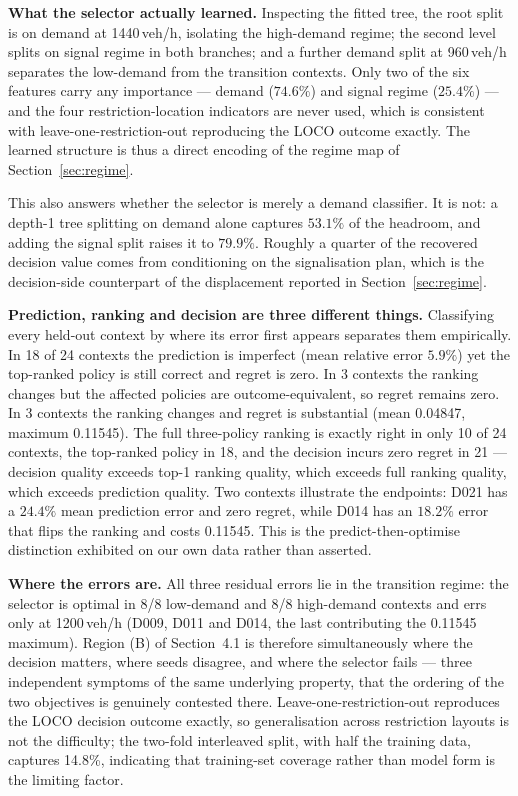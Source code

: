 \documentclass[10pt,a4paper]{article}
\begin{document}
\textbf{What the selector actually learned.} Inspecting the fitted tree, the root split is on demand at 1440\,veh/h, isolating the high-demand regime; the second level splits on signal regime in both branches; and a further demand split at 960\,veh/h separates the low-demand from the transition contexts. Only two of the six features carry any importance --- demand ($74.6\%$) and signal regime ($25.4\%$) --- and the four restriction-location indicators are never used, which is consistent with leave-one-restriction-out reproducing the LOCO outcome exactly. The learned structure is thus a direct encoding of the regime map of Section~\ref{sec:regime}.

This also answers whether the selector is merely a demand classifier. It is not: a depth-1 tree splitting on demand alone captures $53.1\%$ of the headroom, and adding the signal split raises it to $79.9\%$. Roughly a quarter of the recovered decision value comes from conditioning on the signalisation plan, which is the decision-side counterpart of the displacement reported in Section~\ref{sec:regime}.

\textbf{Prediction, ranking and decision are three different things.} Classifying every held-out context by where its error first appears separates them empirically. In 18 of 24 contexts the prediction is imperfect (mean relative error $5.9\%$) yet the top-ranked policy is still correct and regret is zero. In 3 contexts the ranking changes but the affected policies are outcome-equivalent, so regret remains zero. In 3 contexts the ranking changes and regret is substantial (mean 0.04847, maximum 0.11545). The full three-policy ranking is exactly right in only 10 of 24 contexts, the top-ranked policy in 18, and the decision incurs zero regret in 21 --- decision quality exceeds top-1 ranking quality, which exceeds full ranking quality, which exceeds prediction quality. Two contexts illustrate the endpoints: D021 has a $24.4\%$ mean prediction error and zero regret, while D014 has an $18.2\%$ error that flips the ranking and costs 0.11545. This is the predict-then-optimise distinction \cite{R11} exhibited on our own data rather than asserted.

\textbf{Where the errors are.} All three residual errors lie in the transition regime: the selector is optimal in 8/8 low-demand and 8/8 high-demand contexts and errs only at 1200\,veh/h (D009, D011 and D014, the last contributing the 0.11545 maximum). Region (B) of Section~4.1 is therefore simultaneously where the decision matters, where seeds disagree, and where the selector fails --- three independent symptoms of the same underlying property, that the ordering of the two objectives is genuinely contested there. Leave-one-restriction-out reproduces the LOCO decision outcome exactly, so generalisation across restriction layouts is not the difficulty; the two-fold interleaved split, with half the training data, captures 14.8\%, indicating that training-set coverage rather than model form is the limiting factor.
\end{document}
